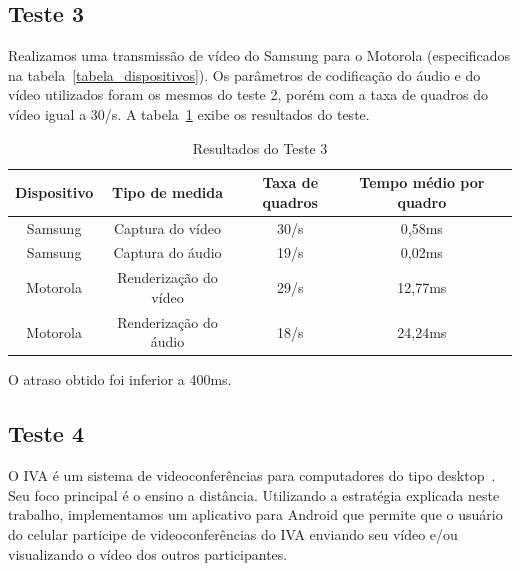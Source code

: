 \documentclass{acm_proc_article-sp}
\begin{document}
\subsection{Teste 3}
Realizamos uma transmissão de vídeo do Samsung para o Motorola (especificados na tabela~\ref{tabela_dispositivos}). Os parâmetros de codificação do áudio e do vídeo utilizados foram os mesmos do teste 2, porém com a taxa de quadros do vídeo igual a 30/s. A tabela~\ref{tabela_teste3} exibe os resultados do teste.
\begin{table}
\centering
\caption{Resultados do Teste 3}
\label{tabela_teste3}
\begin{tabular}{|c|c|c|c|l} \hline
Dispositivo&Tipo de medida&Taxa de quadros&Tempo médio por quadro\\ \hline
Samsung&Captura do vídeo&30/s&0,58ms\\ \hline
Samsung&Captura do áudio&19/s&0,02ms\\ \hline
Motorola&Renderização do vídeo&29/s&12,77ms\\ \hline
Motorola&Renderização do áudio&18/s&24,24ms\\
\hline\end{tabular}
\end{table}
O atraso obtido foi inferior a 400ms.
\subsection{Teste 4}
O IVA é um sistema de videoconferências para computadores do tipo desktop~\cite{roesler_iva}. Seu foco principal é o ensino a distância. Utilizando a estratégia explicada neste trabalho, implementamos um aplicativo para Android que permite que o usuário do celular participe de videoconferências do IVA enviando seu vídeo e/ou visualizando o vídeo dos outros participantes.
\end{document}
